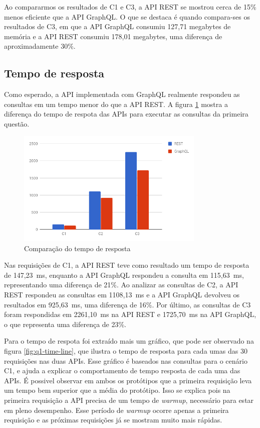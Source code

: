 Ao compararmos os resultados de C1 e C3, a API REST se mostrou cerca de 15\% menos eficiente que a API GraphQL. O que se destaca é quando compara-ses os resultados de C3, em que a API GraphQL consumiu 127,71 megabytes de memória e a API REST consumiu 178,01 megabytes, uma diferença de aproximadamente 30\%.

\subsection{Tempo de resposta}

Como esperado, a API implementada com GraphQL realmente respondeu as consultas em um tempo menor do que a API REST. A figura \ref{fig:q1-time} mostra a diferença do tempo de respota das APIs para executar as consultas da primeira questão.

\begin{figure}[htbp]
    \centering
    \includegraphics[width=0.8\textwidth]{figuras/q1-time.png}
    \caption{Comparação do tempo de resposta}
    \label{fig:q1-time}
    \author{fonte: Autor}
\end{figure}

Nas requisições de C1, a API REST teve como resultado um tempo de resposta de 147,23~ms, enquanto a API GraphQL respondeu a consulta em 115,63~ms, representando uma diferença de 21\%. Ao analizar as consultas de C2, a API REST respondeu as consultas em 1108,13~ms e a API GraphQL devolveu os resultados em 925,63~ms, uma diferença de 16\%. Por último, as consultas de C3 foram respondidas em 2261,10~ms na API REST e 1725,70~ms na API GraphQL, o que representa uma diferença de 23\%.

Para o tempo de respota foi extraído mais um gráfico, que pode ser observado na figura \ref{fig:q1-time-line}, que ilustra o tempo de resposta para cada umas das 30 requisições nas duas APIs. Esse gráfico é baseados nas consultas para o cenário C1, e ajuda a explicar o comportamento de tempo resposta de cada uma das APIs. É possivel observar em ambos os protótipos que a primeira requisição leva um tempo bem superior que a média do protótipo. Isso se explica pois na primeira requisição a API precisa de um tempo de \textit{warmup}, necessário para estar em pleno desempenho. Esse período de \textit{warmup} ocorre apenas a primeira requisição e as próximas requisições já se mostram muito mais rápidas.

